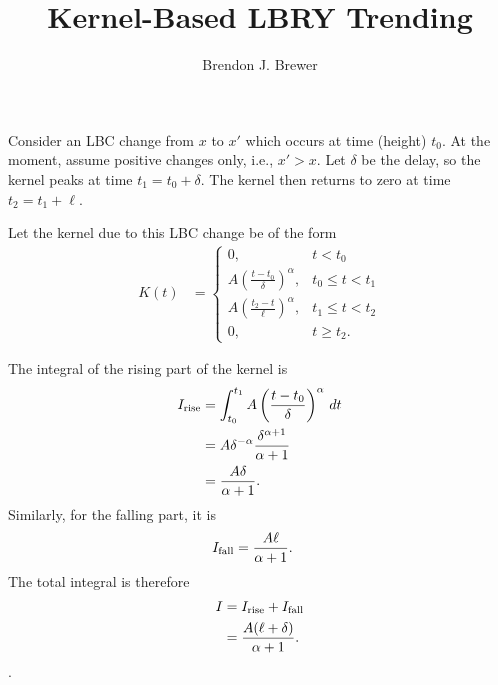 \documentclass[a4paper, 12pt]{article}
\title{Kernel-Based LBRY Trending}
\author{Brendon J. Brewer}
\date{}
\begin{document}
\maketitle


\setlength{\parindent}{0pt}
\setlength{\parskip}{8pt}

Consider an LBC change from $x$ to $x'$ which occurs at time (height) $t_0$.
At the moment, assume positive changes only, i.e., $x' > x$.
Let $\delta$ be the delay, so the kernel peaks at time $t_1 = t_0 + \delta$.
The kernel then returns to zero at time $t_2 = t_1 + \ell$.

Let the kernel due to this LBC change be of the form
\begin{align}
K(t) &=
    \left\{
        \begin{array}{lr}
            0, & t < t_0 \\
            A\left(\frac{t - t_0}{\delta}\right)^\alpha, & t_0 \leq t < t_1 \\
            A\left(\frac{t_2 - t}{\ell}  \right)^\alpha, & t_1 \leq t < t_2 \\
            0, & t \geq t_2.
        \end{array}
    \right.
\end{align}

The integral of the rising part of the kernel is
\begin{align}
I_{\rm rise}
  &= \int_{t_0}^{t_1}A\left(\frac{t - t_0}{\delta}\right)^\alpha \, dt \\
  &= A\delta^{-\alpha}\frac{\delta^{\alpha+1}}{\alpha + 1} \\
  &= \frac{A\delta}{\alpha + 1}.
\end{align}
Similarly, for the falling part, it is
\begin{align}
I_{\rm fall}
  &= \frac{A\ell}{\alpha + 1}.
\end{align}
The total integral is therefore
\begin{align}
I &= I_{\rm rise} + I_{\rm fall} \\
  &= \frac{A(\ell + \delta)}{\alpha + 1}.
\end{align}.
\end{document}
